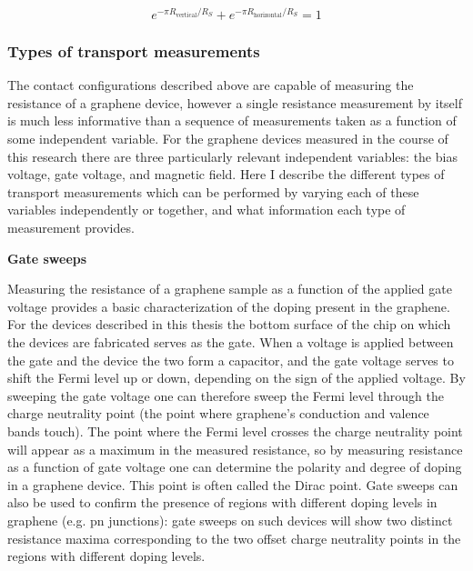 \documentclass[edeposit,fullpage,draftthesis]{uiucthesis2009}
\begin{document}
            \begin{equation}
                e^{-\pi R_{\text{vertical}}/R_S}+e^{-\pi R_{\text{horizontal}}/R_S}=1
            \end{equation}
           
        \subsubsection*{Types of transport measurements}
        
            The contact configurations described above are capable of measuring the resistance of a graphene
            device, however a single resistance measurement by itself is much less informative than
            a sequence of measurements taken as a function of some independent variable. For the graphene
            devices measured in the course of this research there are three particularly relevant
            independent variables: the bias voltage, gate voltage, and magnetic field.
            Here I describe the different types of transport measurements which can be performed by 
            varying each of these variables independently or together, and what information each
            type of measurement provides.
            
            \textbf{Gate sweeps}
            
            Measuring the resistance of a graphene sample as a function of the applied gate voltage 
            provides a basic characterization of the doping present in the graphene. For the
            devices described in this thesis the bottom surface of the chip on which the devices
            are fabricated serves as the gate.
            When a voltage is applied between the gate and the device the two form a capacitor, and
            the gate voltage serves to shift the Fermi level up or down, depending on the sign of the applied voltage. 
            By sweeping the gate voltage one can therefore sweep
            the Fermi level through the charge neutrality point (the point where graphene's conduction and valence bands touch). 
            The point where the Fermi level crosses the charge neutrality point will appear as a maximum
            in the measured resistance, so by measuring resistance as a function of gate voltage one
            can determine the polarity and degree of doping in a graphene device. This point is often called
            the Dirac point. Gate sweeps can also be used to confirm the presence of regions with different
            doping levels in graphene (e.g. pn junctions): gate sweeps on such devices will show two distinct
            resistance maxima corresponding to the two offset charge neutrality points in the regions with
            different doping levels.
            
\end{document}
